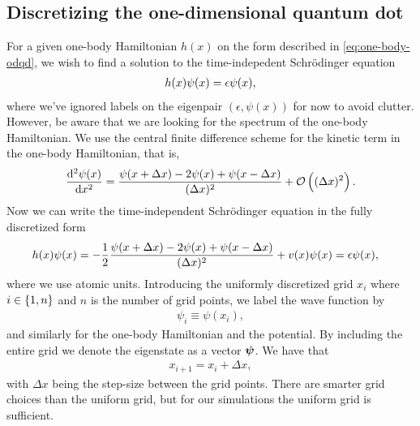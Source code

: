     \subsection{Discretizing the one-dimensional quantum dot}
        \label{subsec:discretizing-the-odqd}
        For a given one-body Hamiltonian $h(x)$ on the form described in
        \autoref{eq:one-body-odqd}, we wish to find a solution to the
        time-indepedent Schrödinger equation
        \begin{align}
            h(x)\psi(x) = \epsilon \psi(x),
        \end{align}
        where we've ignored labels on the eigenpair $(\epsilon, \psi(x))$ for
        now to avoid clutter.
        However, be aware that we are looking for the spectrum of the one-body
        Hamiltonian.
        We use the central finite difference scheme for the kinetic term in the
        one-body Hamiltonian, that is,
        \begin{align}
            \dod[2]{\psi(x)}{x}
            = \frac{
                \psi(x + \Delta x) - 2\psi(x) + \psi(x - \Delta x)
            }{(\Delta x)^2}
            + \mathcal{O}\para{(\Delta x)^2}.
        \end{align}
        Now we can write the time-independent Schrödinger equation in the fully
        discretized form
        \begin{align}
            h(x) \psi(x)
            &= -\frac{1}{2}
            \frac{
                \psi(x + \Delta x) - 2\psi(x) + \psi(x - \Delta x)
            }{(\Delta x)^2}
            + v(x)\psi(x)
            = \epsilon \psi(x),
        \end{align}
        where we use atomic units.
        Introducing the uniformly discretized grid $x_i$ where $i \in \left\{ 1,
        n \right\}$ and $n$ is the number of grid points, we label the wave function by
        \begin{align}
            \psi_i \equiv \psi(x_i),
        \end{align}
        and similarly for the one-body Hamiltonian and the potential.
        By including the entire grid we denote the eigenstate as a vector
        $\boldsymbol{\psi}$.
        We have that
        \begin{align}
            x_{i + 1} = x_i + \Delta x,
        \end{align}
        with $\Delta x$ being the step-size between the grid points.
        There are smarter grid choices than the uniform grid, but for our
        simulations the uniform grid is sufficient.
